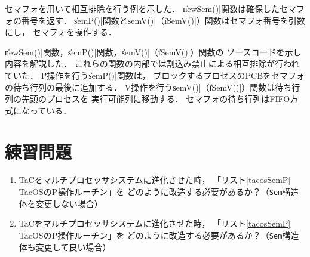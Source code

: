 セマフォを用いて相互排除を行う例を示した．
\|newSem()|関数は確保したセマフォの番号を返す．
\|semP()|関数と\|semV()|（\|iSemV()|）関数はセマフォ番号を引数にし，
セマフォを操作する．

\|newSem()|関数，\|semP()|関数，\|semV()|（\|iSemV()|）関数の
ソースコードを示し内容を解説した．
これらの関数の内部では割込み禁止による相互排除が行われていた．
P操作を行う\|semP()|関数は，
ブロックするプロセスのPCBをセマフォの待ち行列の最後に追加する．
V操作を行う\|semV()|（\|iSemV()|）関数は待ち行列の先頭のプロセスを
実行可能列に移動する．
セマフォの待ち行列はFIFO方式になっている．

\section*{練習問題}
\begin{enumerate}
  \renewcommand{\labelenumi}{\ttfamily\arabic{chapter}.\arabic{enumi}}
  \setlength{\leftskip}{1em}
\item TaCをマルチプロセッサシステムに進化させた時，
  「リスト\ref{tacosSemP} TacOSのP操作ルーチン」を
  どのように改造する必要があるか？（\texttt{Sem}構造体を変更しない場合）
\item TaCをマルチプロセッサシステムに進化させた時，
  「リスト\ref{tacosSemP} TacOSのP操作ルーチン」を
  どのように改造する必要があるか？（\texttt{Sem}構造体も変更して良い場合）
\end{enumerate}
